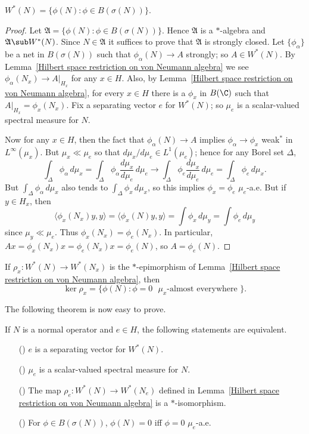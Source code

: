 \begin{lemma}
$W^*(N)=\{\phi(N):\phi\in B(\sigma(N))\}$.
\end{lemma}
\begin{proof}
Let $\mathfrak{A}=\{\phi(N):\phi\in B(\sigma(N))\}$. Hence $\mathfrak{A}$ is a $*$-algebra and $\mathfrak{A}\sub W^*(N)$. Since $N\in\mathfrak{A}$ it suffices to prove that $\mathfrak{A}$ is strongly closed. Let $\{\phi_\alpha\}$ be a net in $B(\sigma(N))$ such that $\phi_\alpha(N)\to A$ strongly; so $A\in W^*(N)$. By Lemma~\ref{Hilbert space restriction on von Neumann algebra} we see $\phi_\alpha(N_x)\to A|_{H_x}$ for any $x\in H$. Also, by Lemma~\ref{Hilbert space restriction on von Neumann algebra}, for every $x\in H$ there is a $\phi_x$ in $B(\C)$ such that $A|_{H_x}=\phi_x(N_x)$. Fix a separating vector $e$ for $W^*(N)$; so $\mu_e$ is a scalar-valued spectral measure for $N$.\par
Now for any $x\in H$, then the fact that $\phi_\alpha(N)\to A$ implies $\phi_\alpha\to\phi_x$ weak$^*$ in $L^\infty(\mu_x)$. But $\mu_x\ll\mu_e$ so that $d\mu_x/d\mu_e\in L^1(\mu_e)$; hence for any Borel set $\Delta$,
\[\int_\Delta\phi_\alpha\,d\mu_x=\int_\Delta\phi_\alpha\frac{d\mu_x}{d\mu_e}\,d\mu_e\to\int_\Delta\phi_e\frac{d\mu_x}{d\mu_e}\,d\mu_e=\int_\Delta\phi_e\,d\mu_x.\]
But $\int_\Delta\phi_\alpha\,d\mu_x$ also tends to $\int_\Delta\phi_x\,d\mu_x$, so this implies $\phi_x=\phi_e$ $\mu_e$-a.e. But if $y\in H_x$, then
\[\langle\phi_x(N_x)y,y\rangle=\langle\phi_x(N)y,y\rangle=\int\phi_x\,d\mu_y=\int\phi_e\,d\mu_y\]
since $\mu_y\ll\mu_e$. Thus $\phi_x(N_x)=\phi_e(N_x)$. In particular, $Ax=\phi_x(N_x)x=\phi_e(N_x)x=\phi_e(N)$, so $A=\phi_e(N)$.
\end{proof}
\begin{corollary}
If $\rho_x:W^*(N)\to W^*(N_x)$ is the $*$-epimorphism of Lemma~\ref{Hilbert space restriction on von Neumann algebra}, then
\[\ker\rho_x=\{\phi(N):\text{$\phi=0$ $\mu_x$-almost everywhere }\}.\]
\end{corollary}
The following theorem is now easy to prove.
\begin{theorem}\label{Hilbert space normal operator separating vector iff}
If $N$ is a normal operator and $e\in H$, the following statements are equivalent.
\begin{itemize}
\item[(\rmnum{1})] $e$ is a separating vector for $W^*(N)$.
\item[(\rmnum{2})] $\mu_e$ is a scalar-valued spectral measure for $N$.
\item[(\rmnum{3})] The map $\rho_e:W^*(N)\to W^*(N_e)$ defined in Lemma~\ref{Hilbert space restriction on von Neumann algebra} is a $*$-isomorphism.
\item[(\rmnum{4})] For $\phi\in B(\sigma(N))$, $\phi(N)=0$ iff $\phi=0$ $\mu_e$-a.e. 
\end{itemize}
\end{theorem}
